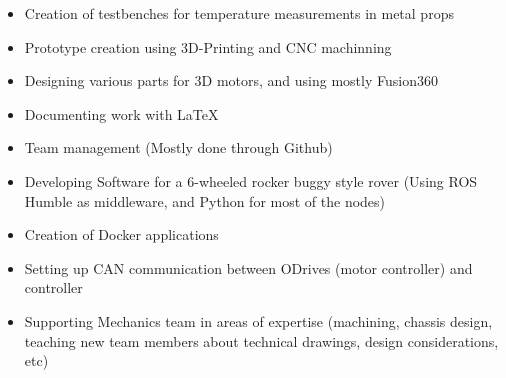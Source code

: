 \documentclass[10pt,a4paper,ragged2e,withhyper]{altacv}
\begin{document}
\begin{paracol}{2}
\newpage


\begin{itemize}
\item Creation of testbenches for temperature measurements in metal props
\item Prototype creation using 3D-Printing and CNC machinning
\item Designing various parts for 3D motors, and using mostly Fusion360
\item Documenting work with LaTeX 
\end{itemize}

\divider

\begin{itemize}
  \item Team management (Mostly done through Github)
  \item Developing Software for a 6-wheeled rocker buggy style rover (Using ROS Humble as middleware, and Python for most of the nodes)
  \item Creation of Docker applications
  \item Setting up CAN communication between ODrives (motor controller) and controller
  \item Supporting Mechanics team in areas of expertise (machining, chassis design, teaching new team members about technical drawings, design considerations, etc)
\end{itemize}

\bigskip


\hspace*{-1em}  %

\newpage


\end{paracol}
\end{document}
